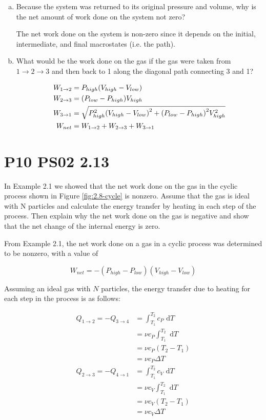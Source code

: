 \documentclass[9pt,a4paper,twocolumn]{article}
\begin{document}
\begin{enumerate}[(a)]
	\item Because the system was returned to its original pressure and volume, why is the net amount of work done on the system not zero?
	
	The net work done on the system is non-zero since it depends on the initial, intermediate, and final macrostates (i.e. the path).
	
	\item What would be the work done on the gas if the gas were taken from $1 \rightarrow 2 \rightarrow 3$ and then back to 1 along the diagonal path connecting 3 and 1?

\begin{align}
	W_{1 \rightarrow 2} &= P_{high}\qty(V_{high} - V_{low}) \\
	W_{2 \rightarrow 3} &= \qty(P_{low} - P_{high})V_{high} \\
	W_{3 \rightarrow 1} &= \sqrt{P_{high}^2\qty(V_{high} - V_{low})^2 + \qty(P_{low} - P_{high})^2 V_{high}^2} \\
	W_{net} &= W_{1 \rightarrow 2} + W_{2 \rightarrow 3} + W_{3 \rightarrow 1}
\end{align}

\end{enumerate}


\section{P10 PS02 2.13}
In Example 2.1 we showed that the net work done on the gas in the cyclic process shown in Figure \ref{fig:2.8-cycle} is nonzero. Assume that the gas is ideal with N particles and calculate the energy transfer by heating in each step of the process. Then explain why the net work done on the gas is negative and show that the net change of the internal energy is zero.

From Example 2.1, the net work done on a gas in a cyclic process was determined to be nonzero, with a value of

\begin{equation}\label{oldanswer}
	W_{net} = -\left( P_{high} - P_{low} \right) \left( V_{high} - V_{low} \right)
\end{equation}

Assuming an ideal gas with $N$ particles, the energy transfer due to heating for each step in the process is as follows:

\begin{align}
	Q_{1 \rightarrow 2} = -Q_{3 \rightarrow 4} & = \int_{T_1}^{T_2} c_P \textrm{ d}T \\
	& = \nu c_P \int_{T_1}^{T_2} \textrm{ d}T \\
	& = \nu c_P \left( T_2 - T_1 \right) \\
	& = \nu c_P \Delta T \label{eq:isobaric} \\
	Q_{2 \rightarrow 3} = -Q_{4 \rightarrow 1} & = \int_{T_1}^{T_2} c_V \textrm{ d}T \\
	& = \nu c_V \int_{T_1}^{T_2} \textrm{ d}T \\
	& = \nu c_V \left( T_2 - T_1 \right) \\
	& = \nu c_V \Delta T \label{eq:isochoric}
\end{align}
\end{document}
